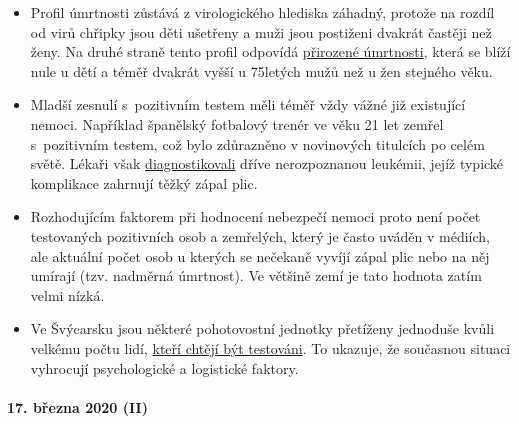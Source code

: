 \begin{itemize}
\tightlist
\item
  Profil úmrtnosti zůstává z virologického hlediska záhadný, protože na
  rozdíl od virů chřipky jsou děti ušetřeny a muži jsou postiženi
  dvakrát častěji než ženy. Na druhé straně tento profil odpovídá
  \href{http://www.gbe-bund.de/gbe10/abrechnung.prc_abr_test_logon?p_uid=gast\&p_aid=0\&p_knoten=FID\&p_sprache=D\&p_suchstring=820}{přirozené
  úmrtnosti}, která se blíží nule u dětí a téměř dvakrát vyšší u
  75letých mužů než u žen stejného věku.
\item
  Mladší zesnulí s~pozitivním testem měli téměř vždy vážné již
  existující nemoci. Například španělský fotbalový trenér ve věku 21 let
  zemřel s~pozitivním testem, což bylo zdůrazněno v novinových titulcích
  po celém světě. Lékaři však
  \href{https://sports.yahoo.com/spanish-football-coach-francisco-garcia-163153573.html}{diagnostikovali}
  dříve nerozpoznanou leukémii, jejíž typické komplikace zahrnují těžký
  zápal plic.
\item
  Rozhodujícím faktorem při hodnocení nebezpečí nemoci proto není počet
  testovaných pozitivních osob a zemřelých, který je často uváděn v
  médiích, ale aktuální počet osob u kterých se nečekaně vyvíjí zápal
  plic nebo na něj umírají (tzv. nadměrná úmrtnost). Ve většině zemí je
  tato hodnota zatím velmi nízká.
\item
  Ve Švýcarsku jsou některé pohotovostní jednotky přetíženy jednoduše
  kvůli velkému počtu lidí,
  \href{https://insideparadeplatz.ch/2020/03/16/notfall-stationen-bereits-seit-tagen-am-anschlag/}{kteří
  chtějí být testováni}. To ukazuje, že současnou situaci vyhrocují
  psychologické a logistické faktory.\\
\end{itemize}

\hypertarget{17-bux159ezna-2020-ii}{%
\paragraph{17. března 2020 (II)}\label{17-bux159ezna-2020-ii}}

